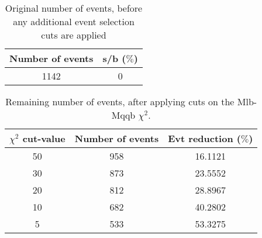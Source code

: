 \documentclass{article}
\begin{document}
 

 \begin{abstract} 
 
   The tables in this document represent the influence of the additional event selection cuts that were applied in order to reduce the number of selected events for CPU reasons. \\ 
   The considered cuts are rather basic and are merely developed to reduce the number of so-called wrong events \\ 
   \begin{itemize} 
     \item Cut on Mlb-Mqqb $\chi^{2}$ distribution 
     \item Cut on top and W-mass window 
   \end{itemize} 
 
   \textbf{Created on :} \today 
 \end{abstract} 
 
 \begin{table}[h!t] 
  \caption{Original number of events, before any additional event selection cuts are applied} 
  \centering 
   \begin{tabular}{c|c} 
     Number of events    & s/b ($\%$)     \\ 
     \hline
     1142  & 0 
 
   \end{tabular} 
 \end{table} 
 
 \begin{table}[h!t] 
  \caption{Remaining number of events, after applying cuts on the Mlb-Mqqb $\chi^{2}$.} 
  \centering 
   \begin{tabular}{c|c|c|} 
     $\chi^{2}$ cut-value    & Number of events  & Evt reduction ($\%$)    \\ 
     \hline
     50  &   958  &  16.1121 \\ 
     30  &   873  &  23.5552 \\ 
     20  &   812  &  28.8967 \\ 
     10  &   682  &  40.2802 \\ 
     5  &   533  &  53.3275 \\ 
   \end{tabular} 
 \end{table} 
 
\end{document}
